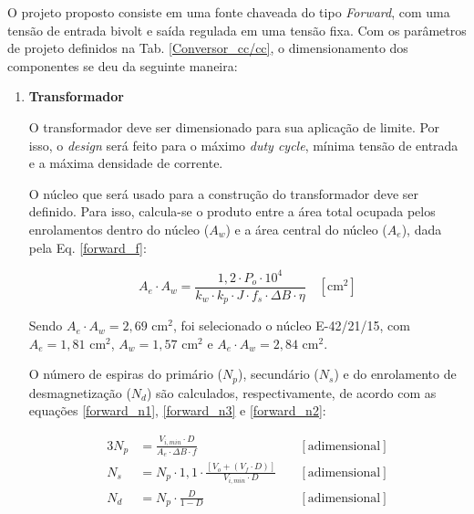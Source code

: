 \begin{apendicesenv}
O projeto proposto consiste em uma fonte chaveada do tipo \textit{Forward}, com uma tensão de entrada bivolt e saída regulada em uma tensão fixa. Com os parâmetros de projeto definidos na Tab. \ref{Conversor_cc/cc}, o dimensionamento dos componentes se deu da seguinte maneira:

\begin{enumerate}
    \item \textbf{Transformador}

O transformador deve ser dimensionado para sua aplicação de limite. Por isso, o \textit{design} será feito para o máximo \textit{duty cycle}, mínima tensão de entrada e a máxima densidade de corrente. 

O núcleo que será usado para a construção do transformador deve ser definido. Para isso, calcula-se o produto entre a área total ocupada pelos enrolamentos dentro do núcleo ($A_{w}$) e a área central do núcleo ($A_{e}$), dada pela Eq. \ref{forward_f}:

    \begin{equation}
        A_{e}\cdot A_{w}= \frac{1,2 \cdot P_{o} \cdot 10^{4}}{k_{w} \cdot k_{p} \cdot J \cdot f_{s} \cdot \Delta B \cdot \eta} \quad [\text{cm}^2]
        \label{forward_f}
    \end{equation}

Sendo $A_{e}\cdot A_{w} = 2,69 $ cm$^{2}$, foi selecionado o núcleo E-42/21/15, com $A_{e} = 1,81$ cm$^{2}$, $A_{w} = 1,57 $ cm$^{2}$ e $A_{e}\cdot A_{w} = 2,84 $ cm$^{2}$. 

 O número de espiras do primário ($N_{p}$), secundário ($N_{s}$) e do enrolamento de desmagnetização ($N_{d}$) são calculados, respectivamente, de acordo com as equações \ref{forward_n1},  \ref{forward_n3} e \ref{forward_n2}:
    
    \begin{alignat}{3}
        N_{p} & = \frac{V_{i,min} \cdot D}{A_{e} \cdot \Delta B \cdot f} \quad & [\text{adimensional}]
        \label{forward_n1}\\
        N_{s} & = N_{p} \cdot 1,1 \cdot \frac{\left[ V_{o} + (V_{f} \cdot D) \right]}{V_{i,min} \cdot D} \quad & [\text{adimensional}]
        \label{forward_n2}\\
        N_{d} & = N_{p} \cdot \frac{D}{1-D} \quad & [\text{adimensional}]
        \label{forward_n3}
    \end{alignat}

    

\end{enumerate}
\end{apendicesenv}
